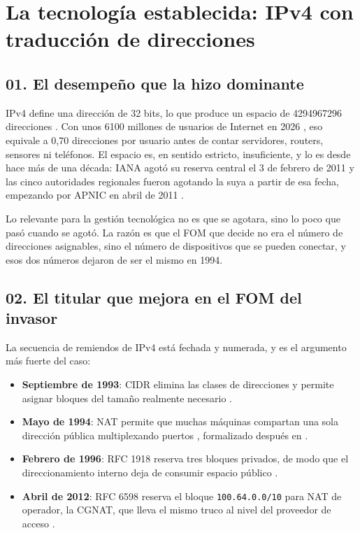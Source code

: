 \documentclass[11pt,letterpaper]{article}
\begin{document}
\section{La tecnología establecida: IPv4 con traducción de direcciones}

\subsection*{01. El desempeño que la hizo dominante}

IPv4 define una dirección de 32 bits, lo que produce un espacio de
\num{4294967296} direcciones \parencite{rfc791}. Con unos \num{6100} millones de
usuarios de Internet en 2026 \parencite{itu2025}, eso equivale a 0,70 direcciones
por usuario antes de contar servidores, routers, sensores ni teléfonos. El
espacio es, en sentido estricto, insuficiente, y lo es desde hace más de una
década: IANA agotó su reserva central el 3 de febrero de 2011 y las cinco
autoridades regionales fueron agotando la suya a partir de esa fecha, empezando
por APNIC en abril de 2011 \parencite{nro2026}.

Lo relevante para la gestión tecnológica no es que se agotara, sino lo poco que
pasó cuando se agotó. La razón es que el FOM que decide no era el número de
direcciones asignables, sino el número de dispositivos que se pueden conectar, y
esos dos números dejaron de ser el mismo en 1994.

\subsection*{02. El titular que mejora en el FOM del invasor}

La secuencia de remiendos de IPv4 está fechada y numerada, y es el argumento más
fuerte del caso:

\begin{itemize}
  \item \textbf{Septiembre de 1993}: CIDR elimina las clases de direcciones y
    permite asignar bloques del tamaño realmente necesario \parencite{rfc1519}.
  \item \textbf{Mayo de 1994}: NAT permite que muchas máquinas compartan una sola
    dirección pública multiplexando puertos \parencite{rfc1631}, formalizado
    después en \textcite{rfc3022}.
  \item \textbf{Febrero de 1996}: RFC 1918 reserva tres bloques privados, de modo
    que el direccionamiento interno deja de consumir espacio público
    \parencite{rfc1918}.
  \item \textbf{Abril de 2012}: RFC 6598 reserva el bloque \texttt{100.64.0.0/10}
    para NAT de operador, la CGNAT, que lleva el mismo truco al nivel del
    proveedor de acceso \parencite{rfc6598}.
\end{itemize}
\end{document}
